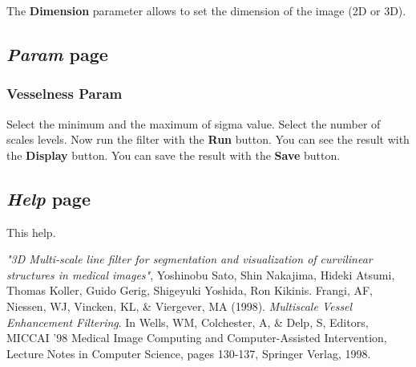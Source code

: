 \documentclass{article}
\begin{document}
The {\bf Dimension} parameter allows to set the dimension of the image (2D or 3D).

\subsection{\emph{Param} page}
\subsubsection{Vesselness Param}
Select the minimum and the maximum of sigma value.
Select the number of scales levels.
Now run the filter with the {\bf Run} button.
You can see the result with the {\bf Display} button.
You can save the result with the {\bf Save} button.

\subsection{\emph{Help} page}
This help.

\begin{thebibliography}{1}
 {\em "3D Multi-scale line filter for segmentation and visualization of curvilinear structures in medical images"}, Yoshinobu Sato, Shin Nakajima, Hideki Atsumi, Thomas Koller, Guido Gerig, Shigeyuki Yoshida, Ron Kikinis.
 Frangi, AF, Niessen, WJ, Vincken, KL, & Viergever, MA (1998). {\em Multiscale Vessel Enhancement Filtering}. In Wells, WM, Colchester, A, & Delp, S, Editors, MICCAI '98 Medical Image Computing and Computer-Assisted Intervention, Lecture Notes in Computer Science, pages 130-137, Springer Verlag, 1998.
\end{thebibliography}
\end{document}
